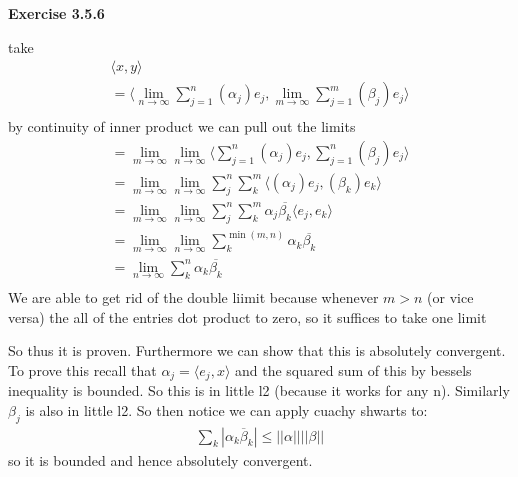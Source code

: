 \documentclass[12pt]{article}
\newenvironment{exercise}[1]{\vspace{.1in}\noindent\textbf{Exercise #1 \hspace{.05em}}}{}
\theoremstyle{definition}
\theoremstyle{remark}
\begin{document}
\begin{exercise}{3.5.6}

	take
	\begin{align}
		\langle x,y\rangle                                                                                                                                                \\
		=\langle \lim_{n \rightarrow \infty}\sum\limits_{j=1}^{n}\left(\alpha_j\right)e_j, \lim_{m \rightarrow \infty}\sum\limits_{j=1}^{m}\left(\beta_j\right)e_j\rangle \\
	\end{align}
	by continuity of inner product we can pull out the limits
	\begin{align}
		=\lim_{m \rightarrow \infty}\lim_{n \rightarrow \infty}\langle \sum\limits_{j=1}^{n}\left(\alpha_j\right)e_j, \sum\limits_{j=1}^{n}\left(\beta_j\right)e_j\rangle \\
		=\lim_{m \rightarrow \infty}\lim_{n \rightarrow \infty}\sum_j^n\sum_k^m\langle \left(\alpha_j\right)e_j, \left(\beta_k\right)e_k\rangle                           \\
		=\lim_{m \rightarrow \infty}\lim_{n \rightarrow \infty}\sum_j^n\sum_k^m\alpha_j\overline{\beta_k}\langle e_j, e_k\rangle                                          \\
		=\lim_{m \rightarrow \infty}\lim_{n \rightarrow \infty}\sum_k^{\min(m,n)}\alpha_k \overline{\beta_k}                                                              \\
		=\lim_{n \rightarrow \infty}\sum_k^{n}\alpha_k \overline{\beta_k}                                                                                                 \\
	\end{align}
	We are able to get rid of the double liimit because whenever $m>n$ (or vice versa) the all of the entries dot product to zero, so it suffices to take one limit

	So thus it is proven. Furthermore we can show that this is absolutely convergent. To prove this recall that $\alpha_j=\langle e_j,x\rangle$ and the squared sum of this by bessels inequality is bounded. So this is in little l2 (because it works for any n). Similarly $\beta_j$ is also in little l2. So then notice we can apply cuachy shwarts to:
	\begin{align}
		\sum_{k}|\alpha_k \overline \beta_k|\leq ||\alpha||||\beta||
	\end{align}
	so it is bounded and hence absolutely convergent.
\end{exercise}
\end{document}
